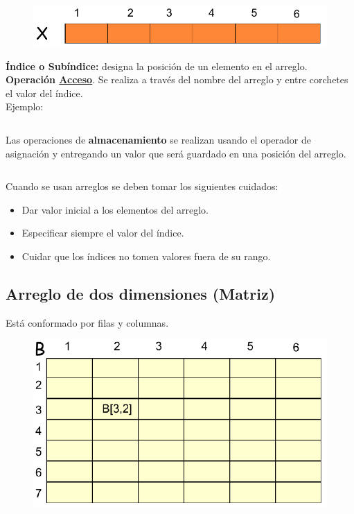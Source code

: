 \documentclass{article}
\begin{document}
\begin{figure}[h!]
  \centering
  \includegraphics[scale=0.5]{./pictures/arreglo_unidimensional.png}
\end{figure}

\textbf{Índice o Subíndice:} designa la posición de un elemento en el arreglo.\\
\textbf{Operación \underline{Acceso}}. Se realiza a través del nombre del arreglo y entre corchetes el valor del índice.\\

Ejemplo:
\inputminted{./pseudocode.py:PseudocodeLexer -x}{./pseudocodigo/acceso.algo}

Las operaciones de \textbf{almacenamiento} se realizan usando el operador de
asignación y entregando un valor que será guardado en una posición del arreglo.\\

\inputminted{./pseudocode.py:PseudocodeLexer -x}{./pseudocodigo/asignacion.algo}

Cuando se usan arreglos se deben tomar los siguientes cuidados:

\begin{itemize}
  \item Dar valor inicial a los elementos del arreglo.
  \item Especificar siempre el valor del índice.
  \item Cuidar que los índices no tomen valores fuera de su rango.
\end{itemize}
\newpage

\subsection*{Arreglo de dos dimensiones (Matriz)}%
Está conformado por filas y columnas.

\begin{figure}[h!]
  \centering
  \includegraphics[scale=0.5]{./pictures/arreglo_bidimensional.png}
\end{figure}
\end{document}
